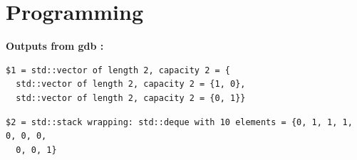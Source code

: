 \documentclass{article}
\begin{document}
\section{Programming}
\begin{figure}[H]
\end{figure}
\textbf{Outputs from gdb :}
\begin{verbatim}
$1 = std::vector of length 2, capacity 2 = {
  std::vector of length 2, capacity 2 = {1, 0},
  std::vector of length 2, capacity 2 = {0, 1}}
\end{verbatim}
\begin{verbatim}
$2 = std::stack wrapping: std::deque with 10 elements = {0, 1, 1, 1, 0, 0, 0,
  0, 0, 1}
\end{verbatim}
\end{document}
